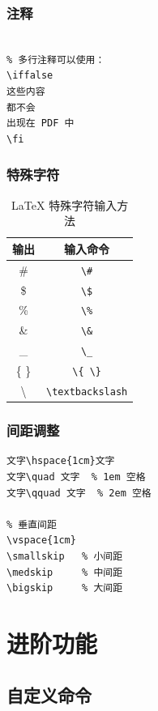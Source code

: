 \documentclass[10pt,openany]{book}
\begin{document}
\subsection{注释}

\begin{lstlisting}[style=pythonstyle]
% 这是单行注释，不会出现在 PDF 中

% 多行注释可以使用：
\iffalse
这些内容
都不会
出现在 PDF 中
\fi
\end{lstlisting}

\subsection{特殊字符}

\begin{table}[h]
    \centering
    \caption{LaTeX 特殊字符输入方法}
    \begin{tabular}{cc}
    \toprule
        输出 & 输入命令 \\
    \midrule
        \# & \verb|\#| \\
        \$ & \verb|\$| \\
        \% & \verb|\%| \\
        \& & \verb|\&| \\
        \_ & \verb|\_| \\
        \{ \} & \verb|\{ \}| \\
        \textbackslash & \verb|\textbackslash| \\
    \bottomrule
    \end{tabular}
\end{table}

\subsection{间距调整}

\begin{lstlisting}[style=pythonstyle]
% 水平间距
文字\hspace{1cm}文字
文字\quad 文字  % 1em 空格
文字\qquad 文字  % 2em 空格

% 垂直间距
\vspace{1cm}
\smallskip   % 小间距
\medskip     % 中间距
\bigskip     % 大间距
\end{lstlisting}

\chapter{进阶功能}

\section{自定义命令}
\end{document}
